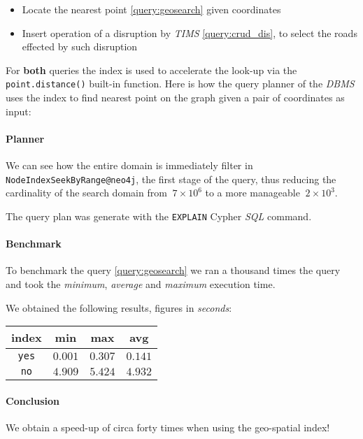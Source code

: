 \begin{itemize}
	\item Locate the nearest point \ref{query:geosearch} given coordinates
	
	\item Insert operation of a disruption by \textit{TIMS} \ref{query:crud_dis}, to select the roads effected by such disruption
\end{itemize}

For \textbf{both} queries the index is used to accelerate the look-up via the 
\texttt{point.distance()} built-in function. Here is how the query planner of 
the \textit{DBMS} uses the index to find nearest point on the graph given a 
pair of coordinates as input:

\paragraph{Planner}
We can see how the entire domain is immediately filter in 
\texttt{NodeIndexSeekByRange@neo4j}, the first stage of the query, thus 
reducing the cardinality of the 
search domain from $~7 \times 10^6$ to a more manageable $~ 2 \times 10^3$.

The query plan was generate with the \texttt{EXPLAIN} Cypher \textit{SQL 
}command.




\paragraph{Benchmark}
To benchmark the query \ref{query:geosearch} we ran a thousand times the query 
and took the \textit{minimum}, \textit{average} and \textit{maximum} execution 
time.



We obtained the following results, figures in \textit{seconds}:

\begin{tabular}{|c|c|c|c|}
	\hline
	index & min & max & avg \\
	\hline
	\hline
	\texttt{yes} & $0.001$ & $0.307$ & $0.141$  \\
	\hline
	\texttt{no} & $4.909$ & $5.424$ & $4.932$  \\
	\hline
\end{tabular}

\paragraph{Conclusion}
We obtain a speed-up of circa forty times when using the geo-spatial index! 

